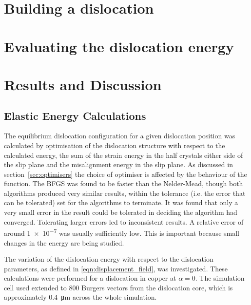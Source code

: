 \section{Building a dislocation}
\FloatBarrier
\label{sec:build}










\section{Evaluating the dislocation energy}
\label{sec:dislocation_energy}






\section{Results and Discussion}

\subsection{Elastic Energy Calculations}
\label{sec:elastic_results}
\FloatBarrier


The equilibrium dislocation configuration for a given dislocation position was calculated by optimisation of the dislocation structure with respect to the calculated energy, the sum of the strain energy in the half crystals either side of the slip plane and the misalignment energy in the slip plane. As discussed in section~\ref{sec:optimisers} the choice of optimiser is affected by the behaviour of the function. The BFGS was found to be faster than the Nelder-Mead, though both algorithms produced very similar results, within the tolerance (i.e. the error that can be tolerated) set for the algorithms to terminate. It was found that only a very small error in the result could be tolerated in deciding the algorithm had converged. Tolerating larger errors led to inconsistent results. A relative error of around \num{1e-7} was usually sufficiently low. This is important because small changes in the energy are being studied. 

The variation of the dislocation energy with respect to the dislocation parameters, as defined in \autoref{eqn:displacement_field}, was investigated. These calculations were performed for a dislocation in copper at $\alpha=0$. The simulation cell used extended to \num{800} Burgers vectors from the dislocation core, which is approximately \SI{0.4}{\micro\meter} across the whole simulation.

